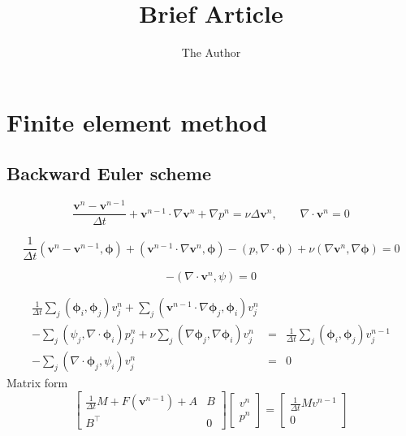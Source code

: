 \documentclass[12pt, oneside]{article}   	%
\title{Brief Article}
\author{The Author}
\newcommand{\vel}{\bm{v}}
\newcommand{\dt}{\Delta t}
\newcommand{\idt}{\frac{1}{\dt}}
\newcommand{\vtest}{\bm{\phi}}
\newcommand{\ptest}{\psi}
\newcommand{\ip}[1]{\left( #1 \right)}
\begin{document}
\maketitle

\section{Finite element method}

\subsection{Backward Euler scheme}
\[
\frac{\vel^n - \vel^{n-1}}{\dt} + \vel^{n-1} \cdot \nabla \vel^{n} + \nabla p^n = \nu \Delta \vel^n, \qquad \nabla \cdot \vel^n = 0
\]

\[
\idt \ip{\vel^n - \vel^{n-1}, \vtest} + \ip{\vel^{n-1} \cdot \nabla \vel^{n}, \vtest} - \ip{p, \nabla\cdot\vtest} + \nu \ip{\nabla\vel^n, \nabla\vtest} = 0
\]

\[
- \ip{\nabla \cdot \vel^n, \ptest} = 0
\]

\begin{eqnarray*}
\idt \sum_j \ip{\vtest_i, \vtest_j} v_j^n  + \sum_j \ip{\vel^{n-1} \cdot \nabla \vtest_j, \vtest_i} v_j^n &&\\
- \sum_j \ip{\psi_j, \nabla\cdot\vtest_i} p_j^n + \nu \sum_j \ip{\nabla\vtest_j, \nabla\vtest_i} v_j^n &=& \idt \sum_j \ip{\vtest_i, \vtest_j} v_j^{n-1} \\
 - \sum_j \ip{\nabla \cdot \vtest_j, \ptest_i} v_j^n &=& 0
\end{eqnarray*}
Matrix form
\[
\begin{bmatrix}
\idt M + F(\vel^{n-1}) + A & B \\
B^\top & 0 \end{bmatrix}
\begin{bmatrix}
v^n \\ p^n \end{bmatrix} = \begin{bmatrix}
\idt M v^{n-1} \\ 0 \end{bmatrix}
\]

\end{document}
